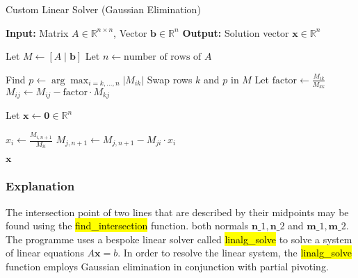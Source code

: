 \documentclass[12pt,a4paper]{report}
\begin{document}
\begin{algorithm}
\caption{Custom Linear Solver (Gaussian Elimination)}
\begin{algorithmic}[1]
\State \textbf{Input:} Matrix $A \in \mathbb{R}^{n \times n}$, Vector $\mathbf{b} \in \mathbb{R}^n$
\State \textbf{Output:} Solution vector $\mathbf{x} \in \mathbb{R}^n$

\State Let $M \gets [A \mid \mathbf{b}]$ 
\State Let $n \gets \text{number of rows of } A$

 
    \State Find $p \gets \arg \max_{i=k,\ldots,n} |M_{ik}|$
        \State Swap rows $k$ and $p$ in $M$
    \EndIf
        \State Let $\text{factor} \gets \frac{M_{ik}}{M_{kk}}$
            \State $M_{ij} \gets M_{ij} - \text{factor} \cdot M_{kj}$
        \EndFor
    \EndFor
\EndFor

\State Let $\mathbf{x} \gets \mathbf{0} \in \mathbb{R}^n$ 

 
    \State $x_i \gets \frac{M_{i,n+1}}{M_{ii}}$
        \State $M_{j,n+1} \gets M_{j,n+1} - M_{ji} \cdot x_i$
    \EndFor
\EndFor

\State \Return $\mathbf{x}$

\end{algorithmic}
\end{algorithm}

\subsubsection{Explanation}
The intersection point of two lines that are described by their midpoints may be found using the \hl{find\_intersection} function. both normals $\mathbf{n}\_1, \mathbf{n}\_2$ and $\mathbf{m}\_1, \mathbf{m}\_2$. The programme uses a bespoke linear solver called \hl{linalg\_solve} to solve a system of linear equations $A \mathbf{x} = b$. In order to resolve the linear system, the \hl{linalg\_solve} function employs Gaussian elimination in conjunction with partial pivoting.


\vspace*{\fill}\newpage
\end{document}
